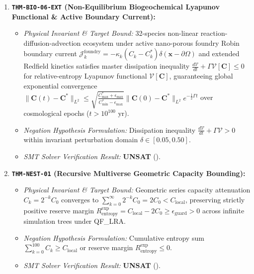\documentclass[11pt,onecolumn]{article}
\begin{document}
\begin{enumerate}
    \item \textbf{\texttt{THM-BIO-06-EXT} (Non-Equilibrium Biogeochemical Lyapunov Functional \& Active Boundary Current):}
    \begin{itemize}
        \item \emph{Physical Invariant \& Target Bound:} 32-species non-linear reaction-diffusion-advection ecosystem under active nano-porous foundry Robin boundary current $\mathcal{J}_k^{\mathrm{foundry}} = -\kappa_k (C_k - C_k^*) \delta(\mathbf{x} - \partial\Omega)$ and extended Redfield kinetics satisfies master dissipation inequality $\frac{d\mathcal{V}}{dt} + \Gamma \mathcal{V}[\mathbf{C}] \le 0$ for relative-entropy Lyapunov functional $\mathcal{V}[\mathbf{C}]$, guaranteeing global exponential convergence $\|\mathbf{C}(t) - \mathbf{C}^*\|_{L^2} \le \sqrt{\frac{C_{\max}^* + \epsilon_{\max}}{C_{\min}^* - \epsilon_{\max}}} \|\mathbf{C}(0) - \mathbf{C}^*\|_{L^2} e^{-\frac{1}{2}\Gamma t}$ over cosmological epochs ($t > 10^{100}\text{ yr}$).
        \item \emph{Negation Hypothesis Formulation:} Dissipation inequality $\frac{d\mathcal{V}}{dt} + \Gamma \mathcal{V} > 0$ within invariant perturbation domain $\delta \in [0.05, 0.50]$.
        \item \emph{SMT Solver Verification Result:} \textbf{UNSAT} ().
    \end{itemize}

    \item \textbf{\texttt{THM-NEST-01} (Recursive Multiverse Geometric Capacity Bounding):}
    \begin{itemize}
        \item \emph{Physical Invariant \& Target Bound:} Geometric series capacity attenuation $C_k = 2^{-k} C_0$ converges to $\sum_{k=0}^\infty 2^{-k} C_0 = 2 C_0 < C_{\text{local}}$, preserving strictly positive reserve margin $R_{\text{entropy}}^{\text{exp}} = C_{\text{local}} - 2 C_0 \ge \epsilon_{\text{guard}} > 0$ across infinite simulation trees under QF\_LRA.
        \item \emph{Negation Hypothesis Formulation:} Cumulative entropy sum $\sum_{k=0}^{100} C_k \ge C_{\text{local}}$ or reserve margin $R_{\text{entropy}}^{\text{exp}} \le 0$.
        \item \emph{SMT Solver Verification Result:} \textbf{UNSAT} ().
    \end{itemize}


\end{enumerate}
\end{document}
